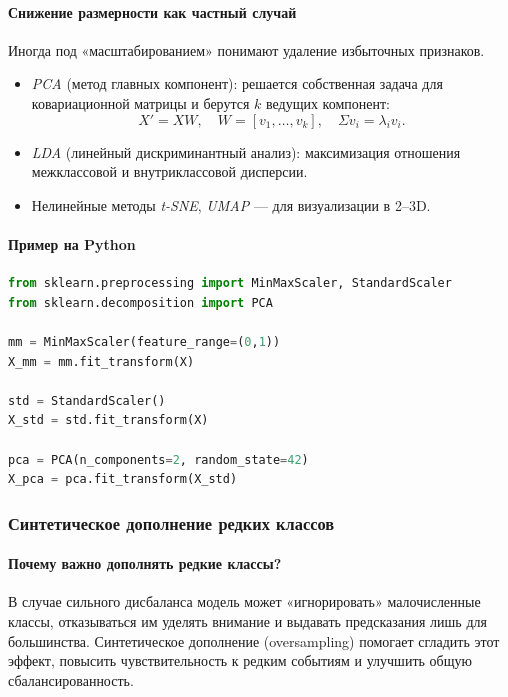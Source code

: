 \begin{center}
\paragraph{Снижение размерности как частный случай}  
Иногда под «масштабированием» понимают удаление избыточных признаков.  
\begin{itemize}
  \item \emph{PCA} (метод главных компонент): решается собственная задача для ковариационной матрицы и берутся \(k\) ведущих компонент:
    \[
      X' = XW,\quad W = [v_1,\dots,v_k],\quad \Sigma v_i = \lambda_i v_i.
    \]
  \item \emph{LDA} (линейный дискриминантный анализ): максимизация отношения межклассовой и внутриклассовой дисперсии.
  \item Нелинейные методы \emph{t-SNE}, \emph{UMAP} — для визуализации в 2–3D.
\end{itemize}

\paragraph{Пример на Python}
\begin{lstlisting}[language=Python]
from sklearn.preprocessing import MinMaxScaler, StandardScaler
from sklearn.decomposition import PCA

mm = MinMaxScaler(feature_range=(0,1))
X_mm = mm.fit_transform(X)

std = StandardScaler()
X_std = std.fit_transform(X)

pca = PCA(n_components=2, random_state=42)
X_pca = pca.fit_transform(X_std)
\end{lstlisting}

\subsubsection{Синтетическое дополнение редких классов}
\label{sec:oversampling}

\paragraph{Почему важно дополнять редкие классы?}  
В случае сильного дисбаланса модель может «игнорировать» малочисленные классы, отказываться им уделять внимание и выдавать предсказания лишь для большинства. Синтетическое дополнение (oversampling) помогает сгладить этот эффект, повысить чувствительность к редким событиям и улучшить общую сбалансированность.


\end{center}
